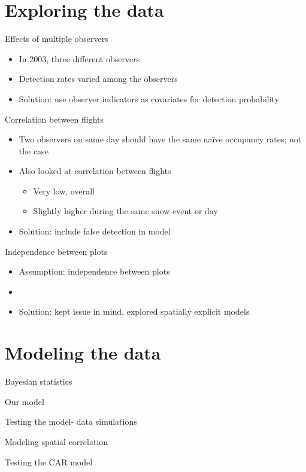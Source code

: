 \documentclass{beamer}
\begin{document}
\section{Exploring the data}
\begin{frame}{Effects of multiple observers}
	\begin{itemize}
		\item In 2003, three different observers
		\item Detection rates varied among the observers
		\item Solution: use observer indicators as covariates for detection probability
	\end{itemize}
\end{frame}

\begin{frame}{Correlation between flights}
	\begin{itemize}
		\item Two observers on same day should have the same na\"ive occupancy rates; not the case
		\item Also looked at correlation between flights
		\begin{itemize}
			\item Very low, overall
			\item Slightly higher during the same snow event or day
		\end{itemize}
		\item Solution: include false detection in model
	\end{itemize}
\end{frame}


\begin{frame}{Independence between plots}
	\begin{itemize}
		\item Assumption: independence between plots
		\item %
		\item Solution: kept issue in mind, explored spatially explicit models
	\end{itemize}
\end{frame}

\section{Modeling the data}
\begin{frame}{Bayesian statistics}
\end{frame}

\begin{frame}{Our model}
\end{frame}

\begin{frame}{Testing the model- data simulations}
\end{frame}

\begin{frame}{Modeling spatial correlation}
\end{frame}

\begin{frame}{Testing the CAR model}
\end{frame}
\end{document}
